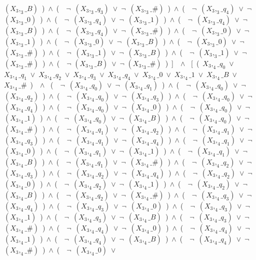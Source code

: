 ﻿\documentclass[a4paper,10pt]{article}
\begin{document}
$(X_3,_3\_B)$\ )\ $\wedge$\ (\ \ $\neg$\ $(X_3,_3\_q_3)$\ $\vee$\ $\neg$\ $(X_3,_3\_\#)$\ )\ $\wedge$\ (\ \ $\neg$\ $(X_3,_3\_q_4)$\ $\vee$\ $\neg$\ $(X_3,_3\_0)$\ )\ $\wedge$\ (\ \ $\neg$\ $(X_3,_3\_q_4)$\ $\vee$\ $\neg$\ $(X_3,_3\_1)$\ )\ $\wedge$\ (\ \ $\neg$\ $(X_3,_3\_q_4)$\ $\vee$\ $\neg$\ $(X_3,_3\_B)$\ )\ $\wedge$\ (\ \ $\neg$\ $(X_3,_3\_q_4)$\ $\vee$\ $\neg$\ $(X_3,_3\_\#)$\ )\ $\wedge$\ (\ \ $\neg$\ $(X_3,_3\_0)$\ $\vee$\ $\neg$\ $(X_3,_3\_1)$\ )\ $\wedge$\ (\ \ $\neg$\ $(X_3,_3\_0)$\ $\vee$\ $\neg$\ $(X_3,_3\_B)$\ )\ $\wedge$\ (\ \ $\neg$\ $(X_3,_3\_0)$\ $\vee$\ $\neg$\ $(X_3,_3\_\#)$\ )\ $\wedge$\ (\ \ $\neg$\ $(X_3,_3\_1)$\ $\vee$\ $\neg$\ $(X_3,_3\_B)$\ )\ $\wedge$\ (\ \ $\neg$\ $(X_3,_3\_1)$\ $\vee$\ $\neg$\ $(X_3,_3\_\#)$\ )\ $\wedge$\ (\ \ $\neg$ $(X_3,_3\_B)$\ $\vee$\ $\neg$ $(X_3,_3\_\#)$\ )\ ]\ \ $\wedge$ \ [\ (\ $X_3,_4\_q_0$\ $\vee$\ $X_3,_4\_q_1$\ $\vee$\ $X_3,_4\_q_2$\ $\vee$\ $X_3,_4\_q_3$\ $\vee$\ $X_3,_4\_q_4$\ $\vee$\ $X_3,_4\_0$\ $\vee$\ $X_3,_4\_1$\ $\vee$\ $X_3,_4\_B$\ $\vee$\ $X_3,_4\_\#$\ )\ \ $\wedge$ \ (\ \ $\neg$\ $(X_3,_4\_q_0)$\ $\vee$\ $\neg$\ $(X_3,_4\_q_1)$\ )\ $\wedge$\ (\ \ $\neg$\ $(X_3,_4\_q_0)$\ $\vee$\ $\neg$\ $(X_3,_4\_q_2)$\ )\ $\wedge$\ (\ \ $\neg$\ $(X_3,_4\_q_0)$\ $\vee$\ $\neg$\ $(X_3,_4\_q_3)$\ )\ $\wedge$\ (\ \ $\neg$\ $(X_3,_4\_q_0)$\ $\vee$\ $\neg$\ $(X_3,_4\_q_4)$\ )\ $\wedge$\ (\ \ $\neg$\ $(X_3,_4\_q_0)$\ $\vee$\ $\neg$\ $(X_3,_4\_0)$\ )\ $\wedge$\ (\ \ $\neg$\ $(X_3,_4\_q_0)$\ $\vee$\ $\neg$\ $(X_3,_4\_1)$\ )\ $\wedge$\ (\ \ $\neg$\ $(X_3,_4\_q_0)$\ $\vee$\ $\neg$\ $(X_3,_4\_B)$\ )\ $\wedge$\ (\ \ $\neg$\ $(X_3,_4\_q_0)$\ $\vee$\ $\neg$\ $(X_3,_4\_\#)$\ )\ $\wedge$\ (\ \ $\neg$\ $(X_3,_4\_q_1)$\ $\vee$\ $\neg$\ $(X_3,_4\_q_2)$\ )\ $\wedge$\ (\ \ $\neg$\ $(X_3,_4\_q_1)$\ $\vee$\ $\neg$\ $(X_3,_4\_q_3)$\ )\ $\wedge$\ (\ \ $\neg$\ $(X_3,_4\_q_1)$\ $\vee$\ $\neg$\ $(X_3,_4\_q_4)$\ )\ $\wedge$\ (\ \ $\neg$\ $(X_3,_4\_q_1)$\ $\vee$\ $\neg$\ $(X_3,_4\_0)$\ )\ $\wedge$\ (\ \ $\neg$\ $(X_3,_4\_q_1)$\ $\vee$\ $\neg$\ $(X_3,_4\_1)$\ )\ $\wedge$\ (\ \ $\neg$\ $(X_3,_4\_q_1)$\ $\vee$\ $\neg$\ $(X_3,_4\_B)$\ )\ $\wedge$\ (\ \ $\neg$\ $(X_3,_4\_q_1)$\ $\vee$\ $\neg$\ $(X_3,_4\_\#)$\ )\ $\wedge$\ (\ \ $\neg$\ $(X_3,_4\_q_2)$\ $\vee$\ $\neg$\ $(X_3,_4\_q_3)$\ )\ $\wedge$\ (\ \ $\neg$\ $(X_3,_4\_q_2)$\ $\vee$\ $\neg$\ $(X_3,_4\_q_4)$\ )\ $\wedge$\ (\ \ $\neg$\ $(X_3,_4\_q_2)$\ $\vee$\ $\neg$\ $(X_3,_4\_0)$\ )\ $\wedge$\ (\ \ $\neg$\ $(X_3,_4\_q_2)$\ $\vee$\ $\neg$\ $(X_3,_4\_1)$\ )\ $\wedge$\ (\ \ $\neg$\ $(X_3,_4\_q_2)$\ $\vee$\ $\neg$\ $(X_3,_4\_B)$\ )\ $\wedge$\ (\ \ $\neg$\ $(X_3,_4\_q_2)$\ $\vee$\ $\neg$\ $(X_3,_4\_\#)$\ )\ $\wedge$\ (\ \ $\neg$\ $(X_3,_4\_q_3)$\ $\vee$\ $\neg$\ $(X_3,_4\_q_4)$\ )\ $\wedge$\ (\ \ $\neg$\ $(X_3,_4\_q_3)$\ $\vee$\ $\neg$\ $(X_3,_4\_0)$\ )\ $\wedge$\ (\ \ $\neg$\ $(X_3,_4\_q_3)$\ $\vee$\ $\neg$\ $(X_3,_4\_1)$\ )\ $\wedge$\ (\ \ $\neg$\ $(X_3,_4\_q_3)$\ $\vee$\ $\neg$\ $(X_3,_4\_B)$\ )\ $\wedge$\ (\ \ $\neg$\ $(X_3,_4\_q_3)$\ $\vee$\ $\neg$\ $(X_3,_4\_\#)$\ )\ $\wedge$\ (\ \ $\neg$\ $(X_3,_4\_q_4)$\ $\vee$\ $\neg$\ $(X_3,_4\_0)$\ )\ $\wedge$\ (\ \ $\neg$\ $(X_3,_4\_q_4)$\ $\vee$\ $\neg$\ $(X_3,_4\_1)$\ )\ $\wedge$\ (\ \ $\neg$\ $(X_3,_4\_q_4)$\ $\vee$\ $\neg$\ $(X_3,_4\_B)$\ )\ $\wedge$\ (\ \ $\neg$\ $(X_3,_4\_q_4)$\ $\vee$\ $\neg$\ $(X_3,_4\_\#)$\ )\ $\wedge$\ (\ \ $\neg$\ $(X_3,_4\_0)$\ $\vee$\ 
\end{document}
